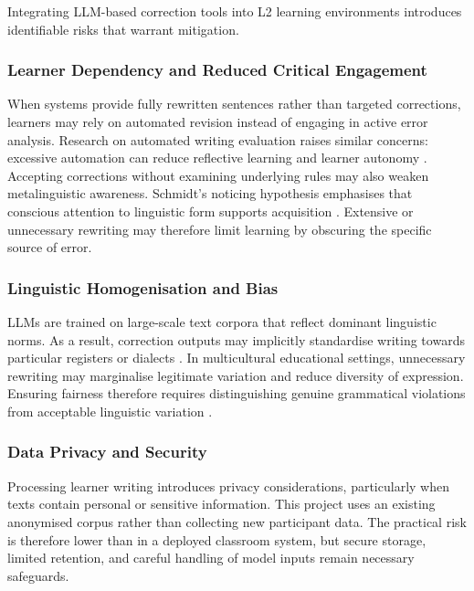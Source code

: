 Integrating LLM-based correction tools into L2 learning environments introduces identifiable risks that warrant mitigation.

\subsubsection{Learner Dependency and Reduced Critical Engagement}

When systems provide fully rewritten sentences rather than targeted corrections, learners may rely on automated revision instead of engaging in active error analysis. Research on automated writing evaluation raises similar concerns: excessive automation can reduce reflective learning and learner autonomy \cite{ke2019automated}. Accepting corrections without examining underlying rules may also weaken metalinguistic awareness. Schmidt's noticing hypothesis emphasises that conscious attention to linguistic form supports acquisition \cite{schmidt1990role}. Extensive or unnecessary rewriting may therefore limit learning by obscuring the specific source of error.

\subsubsection{Linguistic Homogenisation and Bias}

LLMs are trained on large-scale text corpora that reflect dominant linguistic norms. As a result, correction outputs may implicitly standardise writing towards particular registers or dialects \cite{NEURIPS2020_1457c0d6}. In multicultural educational settings, unnecessary rewriting may marginalise legitimate variation and reduce diversity of expression. Ensuring fairness therefore requires distinguishing genuine grammatical violations from acceptable linguistic variation \cite{floridi2018ai4people}.

\subsubsection{Data Privacy and Security}

Processing learner writing introduces privacy considerations, particularly when texts contain personal or sensitive information. This project uses an existing anonymised corpus rather than collecting new participant data. The practical risk is therefore lower than in a deployed classroom system, but secure storage, limited retention, and careful handling of model inputs remain necessary safeguards.

